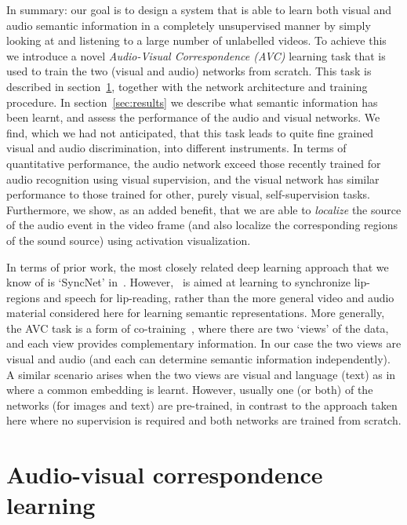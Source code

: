 \documentclass[10pt,twocolumn,letterpaper]{article}
\begin{document}
In summary: our goal is to design a system that is able to learn both
visual and audio semantic information in a completely unsupervised
manner by simply looking at and listening to a large number of
unlabelled videos. To achieve this we introduce a novel 
\emph{Audio-Visual Correspondence (AVC)} learning task that is used
to train the two (visual and audio) networks from scratch. 
This task is described
in section~\ref{sec:approach}, together with the network architecture
and training procedure. In section~\ref{sec:results} we describe what
semantic information has been learnt, and assess the performance of
the audio and visual networks. We find, which we had not anticipated,
that this task leads to quite fine grained visual and audio
discrimination, \eg into different instruments. In terms of
quantitative performance, the audio network exceed those recently
trained for audio recognition using visual supervision, 
and the visual network has similar
performance to those trained for other, purely visual,
self-supervision tasks. Furthermore, we show, as an added benefit, that we are
able to {\em localize} the source of the audio event in the video frame (and
also localize 
the corresponding regions of the sound source) using activation
visualization.

In terms of prior work, the most closely related deep learning
approach that we know of is `SyncNet' in~\cite{Chung16a}. However,
\cite{Chung16a}~is aimed at learning to synchronize lip-regions and speech
for lip-reading, rather than the more general video and audio material
considered here for learning semantic representations.
More generally, the AVC task is a form of co-training~\cite{Blum98}, where there
are two `views' of the data, and each view provides complementary information.
In our case the two views are visual and audio (and each can determine
semantic information independently). A similar scenario arises when
the two views are visual and language (text) as
in~\cite{Frome13,Lei15,Socher13} where a common embedding is learnt. However, usually
one (or both) of the networks (for images and text) are pre-trained,  in contrast to the
approach taken here where no supervision is required and both
networks are trained from scratch.




\section{Audio-visual correspondence learning}
\label{sec:approach}
\label{sec:avc}
\end{document}
